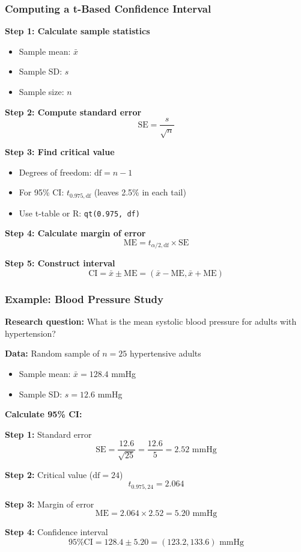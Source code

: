 \documentclass{beamer}
\begin{document}
\begin{frame}
\frametitle{Computing a t-Based Confidence Interval}
\textbf{Step 1: Calculate sample statistics}
\begin{itemize}
\item Sample mean: $\bar{x}$
\item Sample SD: $s$
\item Sample size: $n$
\end{itemize}

\vspace{0.3cm}
\textbf{Step 2: Compute standard error}
$$\text{SE} = \frac{s}{\sqrt{n}}$$

\vspace{0.3cm}
\textbf{Step 3: Find critical value}
\begin{itemize}
\item Degrees of freedom: $\text{df} = n - 1$
\item For 95\% CI: $t_{0.975, \text{df}}$ (leaves 2.5\% in each tail)
\item Use t-table or R: \texttt{qt(0.975, df)}
\end{itemize}

\vspace{0.3cm}
\textbf{Step 4: Calculate margin of error}
$$\text{ME} = t_{\alpha/2, \text{df}} \times \text{SE}$$

\vspace{0.3cm}
\textbf{Step 5: Construct interval}
$$\text{CI} = \bar{x} \pm \text{ME} = (\bar{x} - \text{ME}, \bar{x} + \text{ME})$$
\end{frame}

\begin{frame}
\frametitle{Example: Blood Pressure Study}
\textbf{Research question:} What is the mean systolic blood pressure for adults with hypertension?

\vspace{0.3cm}
\textbf{Data:} Random sample of $n = 25$ hypertensive adults
\begin{itemize}
\item Sample mean: $\bar{x} = 128.4$ mmHg
\item Sample SD: $s = 12.6$ mmHg
\end{itemize}

\vspace{0.3cm}
\textbf{Calculate 95\% CI:}

\textbf{Step 1:} Standard error
$$\text{SE} = \frac{12.6}{\sqrt{25}} = \frac{12.6}{5} = 2.52 \text{ mmHg}$$

\textbf{Step 2:} Critical value ($\text{df} = 24$)
$$t_{0.975, 24} = 2.064$$

\textbf{Step 3:} Margin of error
$$\text{ME} = 2.064 \times 2.52 = 5.20 \text{ mmHg}$$

\textbf{Step 4:} Confidence interval
$$\text{95\% CI} = 128.4 \pm 5.20 = (123.2, 133.6) \text{ mmHg}$$
\end{frame}
\end{document}

